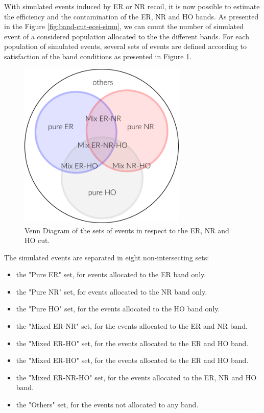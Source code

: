 With simulated events induced by ER or NR recoil, it is now possible to estimate the efficiency and the contamination of the ER, NR and HO bands. As presented in the Figure \ref{fig:band-cut-ecei-simu}, we can count the number of simulated event of a considered population allocated to the the different bands. For each population of simulated events, several sets of events are defined according to satisfaction of the band conditions as presented in Figure \ref{fig:band-venn-diagram}.

\begin{figure}
\centering
\includegraphics[width=\linewidth, height=8cm, keepaspectratio]{Figures/Neutron/band_venn_diagramm.pdf}
\caption{Venn Diagram of the sets of events in respect to the ER, NR and HO cut.}
\label{fig:band-venn-diagram}
\end{figure}

The simulated events are separated in eight non-intersecting sets:
\begin{itemize}
	\item the "Pure ER" set, for events allocated to the ER band only.
	\item the "Pure NR" set, for events allocated to the NR band only.
	\item the "Pure HO" set, for the events allocated to the HO band only.
	\item the "Mixed ER-NR" set, for the events allocated to the ER and NR band.
	\item the "Mixed ER-HO" set, for the events allocated to the ER and HO band.
	\item the "Mixed ER-HO" set, for the events allocated to the ER and HO band.
	\item the "Mixed ER-NR-HO" set, for the events allocated to the ER, NR and HO band.
	\item the "Others" set, for the events not allocated to any band.
\end{itemize}

